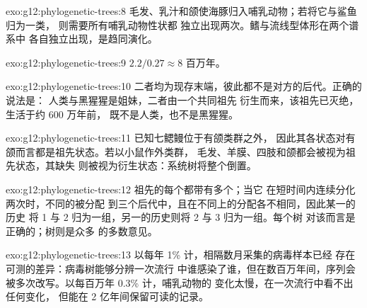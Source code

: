 \begin{solution}{exo:g12:phylogenetic-trees:8}
毛发、乳汁和颌使海豚归入哺乳动物；若将它与鲨鱼归为一类，
则需要所有哺乳动物性状都
独立出现两次。鳍与流线型体形在两个谱系中
各自独立出现，是趋同演化。
\end{solution}

\begin{solution}{exo:g12:phylogenetic-trees:9}
$2.2/0.27 \approx 8$ 百万年。
\end{solution}

\begin{solution}{exo:g12:phylogenetic-trees:10}
二者均为现存末端，彼此都不是对方的后代。正确的说法是：
人类与黑猩猩是姐妹，二者由一个共同祖先
衍生而来，该祖先已灭绝，生活于约 600 万年前，
既不是人类，也不是黑猩猩。
\end{solution}

\begin{solution}{exo:g12:phylogenetic-trees:11}
已知七鳃鳗位于有颌类群之外，
因此其各状态对有颌而言都是祖先状态。若以小鼠作外类群，
毛发、羊膜、四肢和颌都会被视为祖先状态，其缺失
则被视为衍生状态：系统树将整个倒置。
\end{solution}

\begin{solution}{exo:g12:phylogenetic-trees:12}
祖先的每个都带有多个；当它
在短时间内连续分化两次时，不同的被分配
到三个后代中，且在不同上的分配各不相同，因此某一的历史
将 1 与 2 归为一组，另一的历史则将 2 与 3 归为一组。每个树
对该而言是正确的；树则是众多
的多数意见。
\end{solution}

\begin{solution}{exo:g12:phylogenetic-trees:13}
以每年 1\% 计，相隔数月采集的病毒样本已经
存在可测的差异：病毒树能够分辨一次流行
中谁感染了谁，但在数百万年间，序列会
被多次改写。以每百万年 0.3\% 计，哺乳动物的
变化太慢，在一次流行中看不出任何变化，
但能在 2 亿年间保留可读的记录。
\end{solution}

